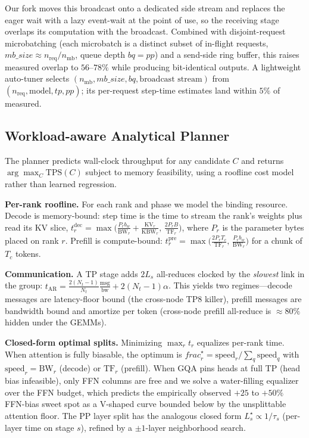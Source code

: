 \documentclass[twocolumn]{article}
\begin{document}
Our fork moves this broadcast onto a dedicated side stream and replaces the eager wait with a lazy event-wait at the point of use, so the receiving stage overlaps its computation with the broadcast. Combined with disjoint-request microbatching (each microbatch is a distinct subset of in-flight requests, $\textit{mb\_size}\approx n_{\text{req}}/n_{\text{mb}}$, queue depth $bq{=}\textit{pp}$) and a send-side ring buffer, this raises measured overlap to $56$--$78\%$ while producing bit-identical outputs. A lightweight auto-tuner selects $(n_{\text{mb}}, \textit{mb\_size}, bq, \text{broadcast stream})$ from $(n_{\text{req}}, \text{model}, \textit{tp}, \textit{pp})$; its per-request step-time estimates land within $5\%$ of measured.

\subsection{Workload-aware Analytical Planner}
\label{sec:approach-planner}

The planner predicts wall-clock throughput for any candidate $C$ and returns $\arg\max_C \text{TPS}(C)$ subject to memory feasibility, using a roofline cost model rather than learned regression.

\textbf{Per-rank roofline.} For each rank and phase we model the binding resource. Decode is memory-bound: step time is the time to stream the rank's weights plus read its KV slice, $t^{\text{dec}}_r=\max\!\big(\tfrac{P_r b_w}{\text{BW}_r}+\tfrac{\text{KV}_r}{\text{KBW}_r},\,\tfrac{2P_r B}{\text{TF}_r}\big)$, where $P_r$ is the parameter bytes placed on rank $r$. Prefill is compute-bound: $t^{\text{pre}}_r=\max\!\big(\tfrac{2P_r T_c}{\text{TF}_r},\,\tfrac{P_r b_w}{\text{BW}_r}\big)$ for a chunk of $T_c$ tokens.

\textbf{Communication.} A TP stage adds $2L_s$ all-reduces clocked by the \emph{slowest} link in the group: $t_{\text{AR}}=\tfrac{2(N_t-1)}{N_t}\tfrac{\text{msg}}{\text{bw}}+2(N_t-1)\alpha$. This yields two regimes---decode messages are latency-floor bound (the cross-node TP8 killer), prefill messages are bandwidth bound and amortize per token (cross-node prefill all-reduce is $\approx\!80\%$ hidden under the GEMMs).

\textbf{Closed-form optimal splits.} Minimizing $\max_r t_r$ equalizes per-rank time. When attention is fully biasable, the optimum is $\textit{frac}_r^\star=\text{speed}_r/\sum_q \text{speed}_q$ with $\text{speed}_r{=}\text{BW}_r$ (decode) or $\text{TF}_r$ (prefill). When GQA pins heads at full TP (head bias infeasible), only FFN columns are free and we solve a water-filling equalizer over the FFN budget, which predicts the empirically observed $+25$ to $+50\%$ FFN-bias sweet spot as a V-shaped curve bounded below by the unsplittable attention floor. The PP layer split has the analogous closed form $L_s^\star\propto 1/\tau_s$ (per-layer time on stage $s$), refined by a $\pm1$-layer neighborhood search.
\end{document}
